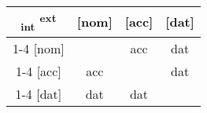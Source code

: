 
\begin{tabular}{c|c|c|c}
  \toprule
      \textsubscript{\ac{int}} \textsuperscript{\ac{ext}}
        & [\ac{nom}]
        & [\ac{acc}]
        & [\ac{dat}]
        \\ \cmidrule{1-4}
    [\ac{nom}]
        &
        & \ac{acc}
        & \ac{dat}
        \\ \cmidrule{1-4}
    [\ac{acc}]
        & \ac{acc}
        &
        & \ac{dat}
        \\ \cmidrule{1-4}
    [\ac{dat}]
        & \ac{dat}
        & \ac{dat}
        &
        \\
  \bottomrule
\end{tabular}
